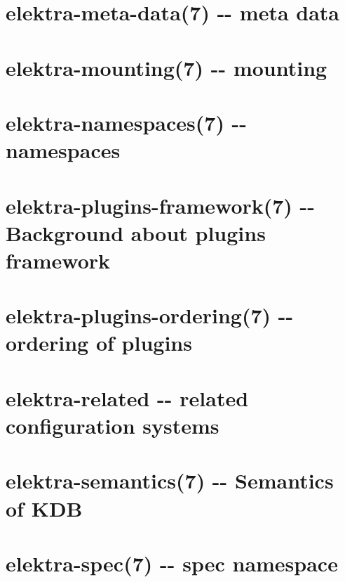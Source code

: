 \documentclass[twoside]{book}
\newcommand{\+}{\discretionary{\mbox{\scriptsize$\hookleftarrow$}}{}{}}
\begin{document}
\chapter{elektra-\/meta-\/data(7) -\/-\/ meta data}
\label{md_doc_help_elektra-meta-data}
\hypertarget{md_doc_help_elektra-meta-data}{}

\chapter{elektra-\/mounting(7) -\/-\/ mounting}
\label{md_doc_help_elektra-mounting}
\hypertarget{md_doc_help_elektra-mounting}{}

\chapter{elektra-\/namespaces(7) -\/-\/ namespaces}
\label{md_doc_help_elektra-namespaces}
\hypertarget{md_doc_help_elektra-namespaces}{}

\chapter{elektra-\/plugins-\/framework(7) -\/-\/ Background about plugins framework}
\label{md_doc_help_elektra-plugins-framework}
\hypertarget{md_doc_help_elektra-plugins-framework}{}

\chapter{elektra-\/plugins-\/ordering(7) -\/-\/ ordering of plugins}
\label{md_doc_help_elektra-plugins-ordering}
\hypertarget{md_doc_help_elektra-plugins-ordering}{}

\chapter{elektra-\/related -\/-\/ related configuration systems}
\label{md_doc_help_elektra-related}
\hypertarget{md_doc_help_elektra-related}{}

\chapter{elektra-\/semantics(7) -\/-\/ Semantics of K\+D\+B}
\label{md_doc_help_elektra-semantics}
\hypertarget{md_doc_help_elektra-semantics}{}

\chapter{elektra-\/spec(7) -\/-\/ spec namespace}
\label{md_doc_help_elektra-spec}
\hypertarget{md_doc_help_elektra-spec}{}

\end{document}
